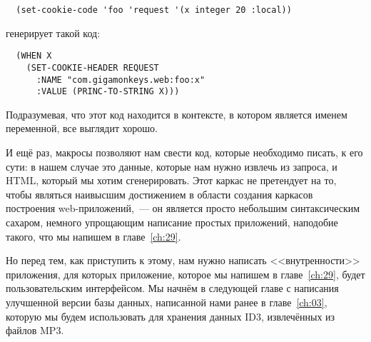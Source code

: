 \begin{lstlisting}
  (set-cookie-code 'foo 'request '(x integer 20 :local))
\end{lstlisting}

генерирует такой код:

\begin{lstlisting}
  (WHEN X
    (SET-COOKIE-HEADER REQUEST
      :NAME "com.gigamonkeys.web:foo:x"
      :VALUE (PRINC-TO-STRING X)))
\end{lstlisting}

Подразумевая, что этот код находится в контексте, в котором  является именем
переменной, все выглядит хорошо.

И ещё раз, макросы позволяют нам свести код, которые необходимо писать, к его сути: в
нашем случае это данные, которые нам нужно извлечь из запроса, и HTML, который мы хотим
сгенерировать. Этот каркас не претендует на то, чтобы являться наивысшим достижением в
области создания каркасов построения web-приложений,~--- он является просто небольшим
синтаксическим сахаром, немного упрощающим написание простых приложений, наподобие такого,
что мы напишем в главе~\ref{ch:29}.

Но перед тем, как приступить к этому, нам нужно написать <<внутренности>> приложения, для
которых приложение, которое мы напишем в главе~\ref{ch:29}, будет пользовательским
интерфейсом. Мы начнём в следующей главе с написания улучшенной версии базы данных,
написанной нами ранее в главе~\ref{ch:03}, которую мы будем использовать для хранения
данных ID3, извлечённых из файлов MP3.

